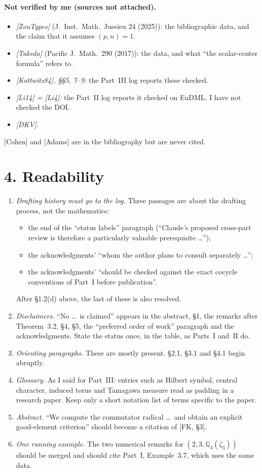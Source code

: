 \documentclass[11pt]{article}
\theoremstyle{definition}
\begin{document}
\paragraph{Not verified by me (sources not attached).}
\begin{itemize}
\item \emph{[ZouTypes]} (J.\ Inst.\ Math.\ Jussieu 24 (2025)): the
bibliographic data, and the claim that it assumes $(p,n)=1$.
\item \emph{[Takeda]} (Pacific J.\ Math.\ 290 (2017)): the data, and what
``the scalar-center formula'' refers to.
\item \emph{[Kottwitz84], \S\S5, 7--9:} the Part~III log reports these
checked.
\item \emph{[Li14] = [Li4]:} the Part~II log reports it checked on EuDML.
I have not checked the DOI.
\item \emph{[DKV].}
\end{itemize}
[Cohen] and [Adams] are in the bibliography but are never cited.

\section*{4. Readability}
\begin{enumerate}[label=(R\arabic*)]
\item \emph{Drafting history must go to the log.} Three passages are about
the drafting process, not the mathematics:
\begin{itemize}
\item the end of the ``status labels'' paragraph (``Claude's proposed
cross-part review is therefore a particularly valuable prerequisite
\ldots'');
\item the acknowledgments' ``whom the author plans to consult separately
\ldots'';
\item the acknowledgments' ``should be checked against the exact cocycle
conventions of Part~I before publication''.
\end{itemize}
After \S1.2(d) above, the last of these is also resolved.
\item \emph{Disclaimers.} ``No \ldots\ is claimed'' appears in the
abstract, \S1, the remarks after Theorem~3.2, \S4, \S5, the ``preferred
order of work'' paragraph and the acknowledgments. State the status once,
in the table, as Parts~I and~II do.
\item \emph{Orienting paragraphs.} These are mostly present. \S2.1, \S3.1 and
\S4.1 begin abruptly.
\item \emph{Glossary.} As I said for Part~III: entries such as Hilbert symbol,
central character, induced torus and Tamagawa measure read as padding in
a research paper. Keep only a short notation list of terms specific to
the paper.
\item \emph{Abstract.} ``We compute the commutator radical \ldots\ and obtain
an explicit good-element criterion'' should become a citation of [FK, \S3].
\item \emph{One running example.} The two numerical remarks for
$(2,3,\mathbb Q_3(\zeta_3))$ should be merged and should cite Part~I,
Example~3.7, which uses the same data.
\end{enumerate}
\end{document}
